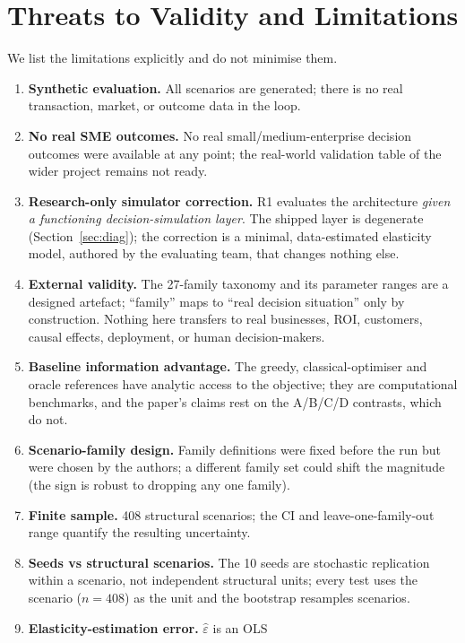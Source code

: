\documentclass[conference]{IEEEtran}
\begin{document}
\section{Threats to Validity and Limitations}\label{sec:threats}
We list the limitations explicitly and do not minimise them.
\begin{enumerate}
  \item \textbf{Synthetic evaluation.} All scenarios are generated; there is no
        real transaction, market, or outcome data in the loop.
  \item \textbf{No real SME outcomes.} No real small/medium-enterprise decision
        outcomes were available at any point; the real-world validation table of
        the wider project remains not ready.
  \item \textbf{Research-only simulator correction.} R1 evaluates the
        architecture \emph{given a functioning decision-simulation layer}. The
        shipped layer is degenerate (Section~\ref{sec:diag}); the correction is
        a minimal, data-estimated elasticity model, authored by the evaluating
        team, that changes nothing else.
  \item \textbf{External validity.} The 27-family taxonomy and its parameter
        ranges are a designed artefact; ``family'' maps to ``real decision
        situation'' only by construction. Nothing here transfers to real
        businesses, ROI, customers, causal effects, deployment, or human
        decision-makers.
  \item \textbf{Baseline information advantage.} The greedy, classical-optimiser
        and oracle references have analytic access to the objective; they are
        computational benchmarks, and the paper's claims rest on the A/B/C/D
        contrasts, which do not.
  \item \textbf{Scenario-family design.} Family definitions were fixed before
        the run but were chosen by the authors; a different family set could
        shift the magnitude (the sign is robust to dropping any one family).
  \item \textbf{Finite sample.} 408 structural scenarios; the CI and
        leave-one-family-out range quantify the resulting uncertainty.
  \item \textbf{Seeds vs structural scenarios.} The 10 seeds are stochastic
        replication within a scenario, not independent structural units; every
        test uses the scenario ($n=408$) as the unit and the bootstrap resamples
        scenarios.
  \item \textbf{Elasticity-estimation error.} $\hat\varepsilon$ is an OLS

\end{enumerate}
\end{document}
